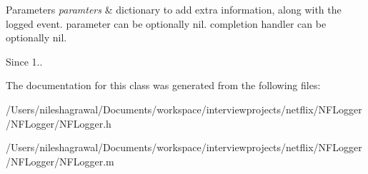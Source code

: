 \begin{DoxyParams}{Parameters}
{\em paramters} & dictionary to add extra information, along with the logged event. parameter can be optionally nil. completion handler can be optionally nil. \\
\hline
\end{DoxyParams}
\begin{DoxySince}{Since}
1.. 
\end{DoxySince}


The documentation for this class was generated from the following files\+:\begin{DoxyCompactItemize}
\item 
/\+Users/nileshagrawal/\+Documents/workspace/interviewprojects/netflix/\+N\+F\+Logger/\+N\+F\+Logger/N\+F\+Logger.\+h\item 
/\+Users/nileshagrawal/\+Documents/workspace/interviewprojects/netflix/\+N\+F\+Logger/\+N\+F\+Logger/N\+F\+Logger.\+m\end{DoxyCompactItemize}

